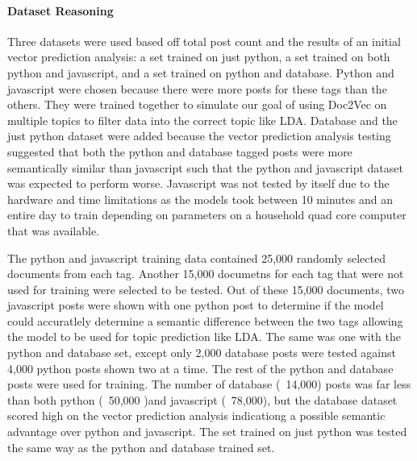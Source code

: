 \paragraph{Dataset Reasoning} Three datasets were used based off total post count and the results of an initial vector prediction analysis: a set trained on just python, a set trained on both python and javascript, and a set trained on python and database. Python and javascript were chosen because there were more posts for these tags than the others. They were trained together to simulate our goal of using Doc2Vec on multiple topics to filter data into the correct topic like LDA. Database and the just python dataset were added because the vector prediction analysis testing suggested that both the python and database tagged posts were more semantically similar than javascript such that the python and javascript dataset was expected to perform worse. Javascript was not tested by itself due to the hardware and time limitations as the models took between 10 minutes and an entire day to train depending on parameters on a household quad core computer that was available.

 The python and javascript training data contained 25,000 randomly selected documents from each tag. Another 15,000 documetns for each tag that were not used for training were selected to be tested. Out of these 15,000 documents, two javascript posts were shown with one python post to determine if the model could accuratlely determine a semantic difference between the two tags allowing the model to be used for topic prediction like LDA. The same was one with the python and database set, except only 2,000 database posts were tested against 4,000 python posts shown two at a time. The rest of the python and database posts were used for training. The number of database (~14,000) posts was far less than both python (~50,000 )and javascript (~78,000), but the database dataset scored high on the vector prediction analysis indicationg a possible semantic advantage over python and javascript. The set trained on just python was tested the same way as the python and database trained set.

